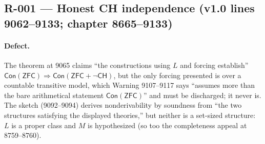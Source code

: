 
\subsection*{R-001 --- Honest CH independence (v1.0 lines 9062--9133; chapter 8665--9133)}

\paragraph{Defect.}
The theorem at 9065 claims ``the constructions using \(L\) and forcing establish'' \(\mathsf{Con}(\mathsf{ZFC})\Rightarrow\mathsf{Con}(\mathsf{ZFC}+\neg\mathsf{CH})\), but the only forcing presented is over a countable transitive model, which Warning 9107--9117 says ``assumes more than the bare arithmetical statement \(\mathsf{Con}(\mathsf{ZFC})\)'' and must be discharged; it never is.  The sketch (9092--9094) derives nonderivability by soundness from ``the two structures satisfying the displayed theories,'' but neither is a set-sized structure: \(L\) is a proper class and \(M\) is hypothesized (so too the completeness appeal at 8759--8760).

